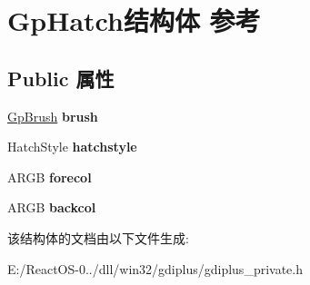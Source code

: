 \hypertarget{struct_gp_hatch}{}\section{Gp\+Hatch结构体 参考}
\label{struct_gp_hatch}
\subsection*{Public 属性}
\begin{DoxyCompactItemize}
\item 
\mbox{\label{struct_gp_hatch_a03df5c9e589947099c0b4bf806f62df4}} 
\hyperlink{struct_gp_brush}{Gp\+Brush} {\bfseries brush}
\item 
\mbox{\label{struct_gp_hatch_ad197e056f7b77037879a51a08811b22e}} 
Hatch\+Style {\bfseries hatchstyle}
\item 
\mbox{\label{struct_gp_hatch_a2ce190016038cd067c9b080faae176ad}} 
A\+R\+GB {\bfseries forecol}
\item 
\mbox{\label{struct_gp_hatch_a534af7d1b2d1afb6e7cb148b8e9b6214}} 
A\+R\+GB {\bfseries backcol}
\end{DoxyCompactItemize}


该结构体的文档由以下文件生成\+:\begin{DoxyCompactItemize}
\item 
E\+:/\+React\+O\+S-\/0../dll/win32/gdiplus/gdiplus\+\_\+private.\+h\end{DoxyCompactItemize}
